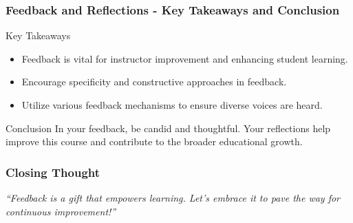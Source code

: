 \documentclass[aspectratio=169]{beamer}
\begin{document}
\begin{frame}[fragile]
    \frametitle{Feedback and Reflections - Key Takeaways and Conclusion}
    \begin{block}{Key Takeaways}
        \begin{itemize}
            \item Feedback is vital for instructor improvement and enhancing student learning.
            \item Encourage specificity and constructive approaches in feedback.
            \item Utilize various feedback mechanisms to ensure diverse voices are heard.
        \end{itemize}
    \end{block}
    \begin{block}{Conclusion}
        In your feedback, be candid and thoughtful. Your reflections help improve this course and contribute to the broader educational growth. 
    \end{block}
\end{frame}

\begin{frame}[fragile]
    \frametitle{Closing Thought}
    \begin{center}
        \textit{“Feedback is a gift that empowers learning. Let’s embrace it to pave the way for continuous improvement!”}
    \end{center}
\end{frame}
\end{document}
